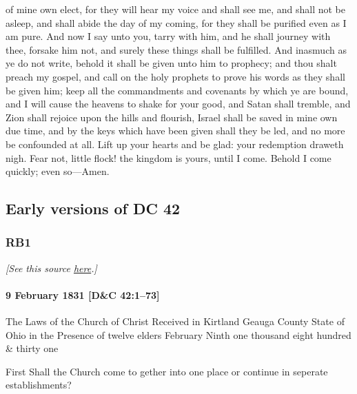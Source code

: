 of mine own elect, for they will hear my voice and shall see me, and shall not be asleep, and shall abide the day of my coming, for they shall be purified even as I am pure. And now I say unto you, tarry with him, and he shall journey with thee, forsake him not, and surely these things shall be fulfilled. And inasmuch as ye do not write, behold it shall be given unto him to prophecy; and thou shalt preach my gospel, and call on the holy prophets to prove his words as they shall be given him; keep all the commandments and covenants by which ye are bound, and I will cause the heavens to shake for your good, and Satan shall tremble, and Zion shall rejoice upon the hills and flourish, Israel shall be saved in mine own due time, and by the keys which have been given shall they be led, and no more be confounded at all. Lift up your hearts and be glad: your redemption draweth nigh. Fear not, little flock! the kingdom is yours, until I come. Behold I come quickly; even so---Amen.
		
	\subsection{Early versions of DC 42}
		\label{EXSS-DC42-EARLY}
		
		\subsubsection{RB1}
			\label{EXSS-DC42-EARLY-RB1}
			
			\textit{[See this source \href{https://www.josephsmithpapers.org/paper-summary/revelation-book-1/46}{here}.]}
			
			\paragraph{9 February 1831 [D\&C 42:1--73]}
			
				The Laws of the Church of Christ Received in Kirtland Geauga County State of Ohio in the Presence of twelve elders February Ninth one thousand eight hundred \& thirty one

				First Shall the Church come to gether into one place or continue in seperate establishments?

